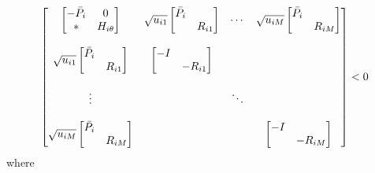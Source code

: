 \documentclass[conference]{IEEEtran}
\begin{document}
\begin{equation}\notag
\begin{bmatrix}
	\begin{bmatrix}
	-\bar{P}_{i}&0\\
	*&H_{i\theta}
	\end{bmatrix}&
	\sqrt{u_{i1}}\begin{bmatrix}
					\bar{P_i}&\\
					&R_{i1}
				 \end{bmatrix}&
	\cdots&
	\sqrt{u_{iM}}\begin{bmatrix}
				     \bar{P_i}&\\
					 &R_{iM}
				 \end{bmatrix}\\ \\
	\sqrt{u_{i1}}\begin{bmatrix}
					 \bar{P_i}&\\
				 	 &R_{i1}
				 \end{bmatrix}&
	\begin{bmatrix}
		-I&\\
		&-R_{i1}
	\end{bmatrix}&\\ \\ \vdots&&\ddots\\ \\
	\sqrt{u_{iM}}\begin{bmatrix}
				 	 \bar{P_i}&\\
					 &R_{iM}
				 \end{bmatrix}&&&
	\begin{bmatrix}
		-I&\\
		&-R_{iM}
	\end{bmatrix}
				 
\end{bmatrix}<0
\end{equation}
where \\
\end{document}
